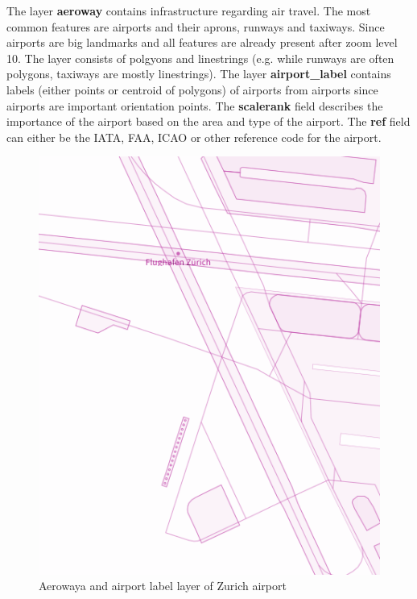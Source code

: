 \noindent\begin{minipage}[t]{0.48\linewidth}
    \vspace{0pt}
    The layer \textbf{aeroway} contains infrastructure regarding air travel. The most common features are airports and their aprons, runways and taxiways. Since airports are big landmarks and all features are already present after zoom level 10. The layer consists of polgyons and linestrings (e.g. while runways are often polygons, taxiways are mostly linestrings).
    The layer \textbf{airport\_label} contains labels (either points or centroid of polygons) of airports from airports since airports are important orientation points.
    The \textbf{scalerank} field describes the importance of the airport based on the area and type of the airport.
    The \textbf{ref} field can either be the IATA, FAA, ICAO or other reference code for the airport.
\end{minipage}
\hfill
\begin{minipage}[t]{0.48\linewidth}
    \vspace{-20pt}
    \begin{figure}[H]
      \centering
      \includegraphics[width=1\textwidth]{images/schema/aeroway_example}
      \caption{Aerowaya and airport label layer of Zurich airport}
    \end{figure}
\end{minipage}

